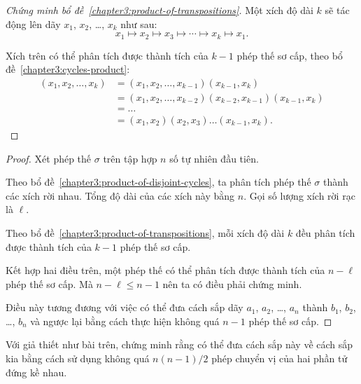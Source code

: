 \documentclass[class=linear-algebra,crop=false]{standalone}
\begin{document}
\begin{proof}[Chứng minh bổ đề~\ref{chapter3:product-of-transpositions}]
	\par Một xích độ dài $k$ sẽ tác động lên dãy $x_{1}$, $x_{2}$, \ldots, $x_{k}$ như sau:
	\[
		x_{1}\mapsto x_{2} \mapsto x_{3} \mapsto \cdots \mapsto x_{k} \mapsto x_{1}.
	\]
	\par Xích trên có thể phân tích được thành tích của $k - 1$ phép thế sơ cấp, theo bổ đề~\ref{chapter3:cycles-product}:
	\begin{align*}
		(x_{1}, x_{2}, \ldots, x_{k}) & = (x_{1}, x_{2}, \ldots, x_{k-1})(x_{k-1}, x_{k})                   \\
		                              & = (x_{1}, x_{2}, \ldots, x_{k-2})(x_{k-2}, x_{k-1})(x_{k-1}, x_{k}) \\
		                              & = \ldots                                                            \\
		                              & = (x_{1}, x_{2})(x_{2}, x_{3})\ldots (x_{k-1}, x_{k}).
	\end{align*}
\end{proof}

\begin{proof}
	\par Xét phép thế $\sigma$ trên tập hợp $n$ số tự nhiên đầu tiên.
	\par Theo bổ đề~\ref{chapter3:product-of-disjoint-cycles}, ta phân tích phép thế $\sigma$ thành các xích rời nhau. Tổng độ dài của các xích này bằng $n$. Gọi số lượng xích rời rạc là $\ell$.
	\par Theo bổ đề~\ref{chapter3:product-of-transpositions}, mỗi xích độ dài $k$ đều phân tích được thành tích của $k-1$ phép thế sơ cấp.
	\par Kết hợp hai điều trên, một phép thế có thể phân tích được thành tích của $n - \ell$ phép thế sơ cấp. Mà $n - \ell \le n - 1$ nên ta có điều phải chứng minh.
	\par Điều này tương đương với việc có thể đưa cách sắp dãy $a_{1}$, $a_{2}$, \ldots, $a_{n}$ thành $b_{1}$, $b_{2}$, \ldots, $b_{n}$ và ngược lại bằng cách thực hiện không quá $n - 1$ phép thế sơ cấp.
\end{proof}

\begin{exercise}
	Với giả thiết như bài trên, chứng minh rằng có thể đưa cách sắp này về cách sắp kia bằng cách sử dụng không quá $n(n-1)/2$ phép chuyển vị của hai phần tử đứng kề nhau.
\end{exercise}
\end{document}
